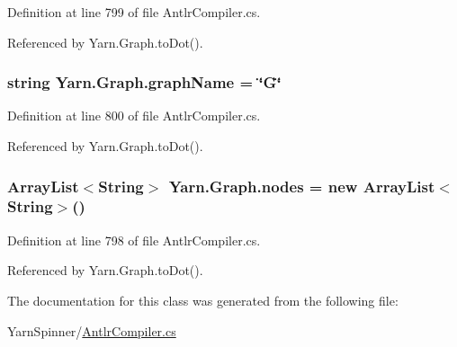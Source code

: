 Definition at line 799 of file Antlr\-Compiler.\-cs.



Referenced by Yarn.\-Graph.\-to\-Dot().

\hypertarget{a00098_a8605f1ec5a4e9cfd07d3ac2be042dac6}{
\subsubsection[{graph\-Name}]{\setlength{\rightskip}{0pt plus 5cm}string Yarn.\-Graph.\-graph\-Name = \char`\"{}G\char`\"{}}}\label{a00098_a8605f1ec5a4e9cfd07d3ac2be042dac6}


Definition at line 800 of file Antlr\-Compiler.\-cs.



Referenced by Yarn.\-Graph.\-to\-Dot().

\hypertarget{a00098_a506df6f737a41748c01239bdea5d82b1}{
\subsubsection[{nodes}]{\setlength{\rightskip}{0pt plus 5cm}Array\-List$<${\bf String}$>$ Yarn.\-Graph.\-nodes = new Array\-List$<${\bf String}$>$()}}\label{a00098_a506df6f737a41748c01239bdea5d82b1}


Definition at line 798 of file Antlr\-Compiler.\-cs.



Referenced by Yarn.\-Graph.\-to\-Dot().



The documentation for this class was generated from the following file\-:\begin{DoxyCompactItemize}
\item 
Yarn\-Spinner/\hyperlink{a00288}{Antlr\-Compiler.\-cs}\end{DoxyCompactItemize}
